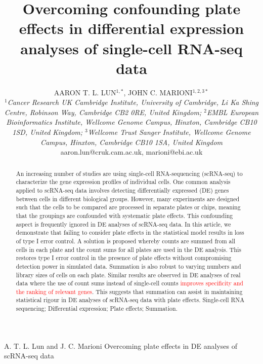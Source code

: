 \documentclass[oupdraft]{bio}
\begin{document}
\title{Overcoming confounding plate effects in differential expression analyses of single-cell RNA-seq data}

\author{AARON T. L. LUN$^{1,\ast}$, JOHN C. MARIONI$^{1,2,3\ast}$ \\[4pt]
    \textit{$^1$Cancer Research UK Cambridge Institute, University of Cambridge, Li Ka Shing Centre, Robinson Way, Cambridge CB2 0RE, United Kingdom;
$^2$EMBL European Bioinformatics Institute, Wellcome Genome Campus, Hinxton, Cambridge CB10 1SD, United Kingdom;
$^3$Wellcome Trust Sanger Institute, Wellcome Genome Campus, Hinxton, Cambridge CB10 1SA, United Kingdom}
    \\[2pt]
{aaron.lun@cruk.cam.ac.uk, marioni@ebi.ac.uk}}

\markboth%
{A. T. L. Lun and J. C. Marioni}
{Overcoming plate effects in DE analyses of scRNA-seq data}

\maketitle


\newcommand\revised[1]{\textcolor{red}{#1}}

\begin{abstract}{
An increasing number of studies are using single-cell RNA-sequencing (scRNA-seq) to characterize the gene expression profiles of individual cells.
One common analysis applied to scRNA-seq data involves detecting differentially expressed (DE) genes between cells in different biological groups.
However, many experiments are designed such that the cells to be compared are processed in separate plates or chips, 
    meaning that the groupings are confounded with systematic plate effects.
This confounding aspect is frequently ignored in DE analyses of scRNA-seq data.
In this article, we demonstrate that failing to consider plate effects in the statistical model results in loss of type I error control.
A solution is proposed whereby counts are summed from all cells in each plate and the count sums for all plates are used in the DE analysis.
This restores type I error control in the presence of plate effects without compromising detection power in simulated data.
Summation is also robust to varying numbers and library sizes of cells on each plate.
Similar results are observed in DE analyses of real data where the use of count sums instead of single-cell counts \revised{improves specificity and the ranking of relevant genes}.
This suggests that summation can assist in maintaining statistical rigour in DE analyses of scRNA-seq data with plate effects.
}
{Single-cell RNA sequencing; Differential expression; Plate effects; Summation.}
\end{abstract}
\end{document}
